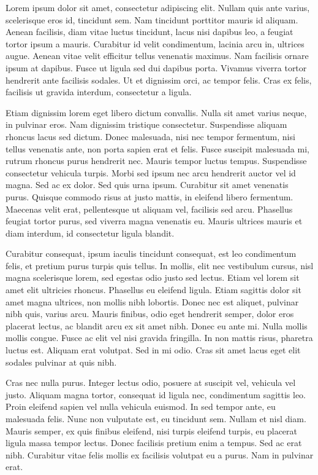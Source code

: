 			Lorem ipsum dolor sit amet, consectetur adipiscing elit. Nullam quis ante varius, scelerisque eros id, tincidunt sem. Nam tincidunt porttitor mauris id aliquam. Aenean facilisis, diam vitae luctus tincidunt, lacus nisi dapibus leo, a feugiat tortor ipsum a mauris. Curabitur id velit condimentum, lacinia arcu in, ultrices augue. Aenean vitae velit efficitur tellus venenatis maximus. Nam facilisis ornare ipsum at dapibus. Fusce ut ligula sed dui dapibus porta. Vivamus viverra tortor hendrerit ante facilisis sodales. Ut et dignissim orci, ac tempor felis. Cras ex felis, facilisis ut gravida interdum, consectetur a ligula.

			Etiam dignissim lorem eget libero dictum convallis. Nulla sit amet varius neque, in pulvinar eros. Nam dignissim tristique consectetur. Suspendisse aliquam rhoncus lacus sed dictum. Donec malesuada, nisi nec tempor fermentum, nisi tellus venenatis ante, non porta sapien erat et felis. Fusce suscipit malesuada mi, rutrum rhoncus purus hendrerit nec. Mauris tempor luctus tempus. Suspendisse consectetur vehicula turpis. Morbi sed ipsum nec arcu hendrerit auctor vel id magna. Sed ac ex dolor. Sed quis urna ipsum. Curabitur sit amet venenatis purus. Quisque commodo risus at justo mattis, in eleifend libero fermentum. Maecenas velit erat, pellentesque ut aliquam vel, facilisis sed arcu. Phasellus feugiat tortor purus, sed viverra magna venenatis eu. Mauris ultrices mauris et diam interdum, id consectetur ligula blandit.

			Curabitur consequat, ipsum iaculis tincidunt consequat, est leo condimentum felis, et pretium purus turpis quis tellus. In mollis, elit nec vestibulum cursus, nisl magna scelerisque lorem, sed egestas odio justo sed lectus. Etiam vel lorem sit amet elit ultricies rhoncus. Phasellus eu eleifend ligula. Etiam sagittis dolor sit amet magna ultrices, non mollis nibh lobortis. Donec nec est aliquet, pulvinar nibh quis, varius arcu. Mauris finibus, odio eget hendrerit semper, dolor eros placerat lectus, ac blandit arcu ex sit amet nibh. Donec eu ante mi. Nulla mollis mollis congue. Fusce ac elit vel nisi gravida fringilla. In non mattis risus, pharetra luctus est. Aliquam erat volutpat. Sed in mi odio. Cras sit amet lacus eget elit sodales pulvinar at quis nibh.

			Cras nec nulla purus. Integer lectus odio, posuere at suscipit vel, vehicula vel justo. Aliquam magna tortor, consequat id ligula nec, condimentum sagittis leo. Proin eleifend sapien vel nulla vehicula euismod. In sed tempor ante, eu malesuada felis. Nunc non vulputate est, eu tincidunt sem. Nullam et nisl diam. Mauris semper, ex quis finibus eleifend, nisi turpis eleifend turpis, eu placerat ligula massa tempor lectus. Donec facilisis pretium enim a tempus. Sed ac erat nibh. Curabitur vitae felis mollis ex facilisis volutpat eu a purus. Nam in pulvinar erat.

